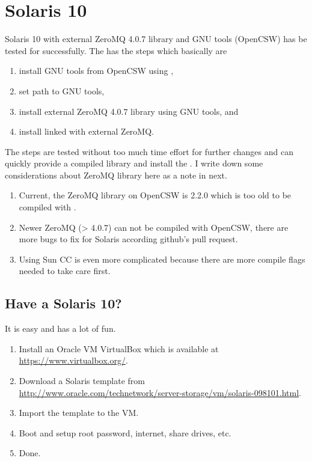 \section[Solaris 10]{Solaris 10}
\label{sec:solaris_10}

Solaris 10 with external ZeroMQ 4.0.7 library and GNU tools (OpenCSW)
has be tested for  successfully. The 
has the steps which basically are
\begin{enumerate}
\item install GNU tools from OpenCSW using ,
\item set path to GNU tools,
\item install external ZeroMQ 4.0.7 library using GNU tools, and
\item install  linked with external ZeroMQ.
\end{enumerate}
The steps are tested without too much time effort for further changes and
can quickly provide a compiled library and install the .
I write down some considerations about ZeroMQ library here as a note in next.
\begin{enumerate}
\item Current, the ZeroMQ library on OpenCSW is 2.2.0 which is too old to
      be compiled with .
\item Newer ZeroMQ (> 4.0.7) can not be compiled with OpenCSW, there are
      more bugs to fix for Solaris according github's pull request.
\item Using Sun CC is even more complicated because there are more
      compile flags needed to take care first.
\end{enumerate}


\subsection[Have a Solaris 10?]{Have a Solaris 10?}
\label{sec:have_solaris_10}

It is easy and has a lot of fun.
\begin{enumerate}
\item
Install an Oracle VM VirtualBox which is available at
\url{https://www.virtualbox.org/}.
\item
Download a Solaris template from \\
\url{http://www.oracle.com/technetwork/server-storage/vm/solaris-098101.html}.
\item
Import the template to the VM.
\item
Boot and setup root password, internet, share drives, etc.
\item
Done.
\end{enumerate}

